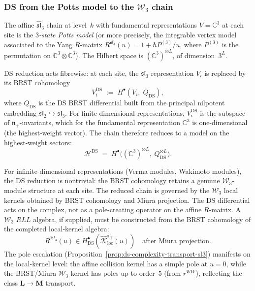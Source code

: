 \subsubsection{DS from the Potts model to the $\mathcal{W}_3$
chain}

\begin{construction}
\label{constr:ds-potts-to-w3}
%
%
The affine $\widehat{\mathfrak{sl}}_3$ chain at level~$k$
with fundamental representations $V = \mathbb{C}^3$ at each
site is the \emph{$3$-state Potts model} (or more precisely,
the integrable vertex model associated to the Yang $R$-matrix
$R^{\mathfrak{sl}_3}(u) = 1 + \hbar P^{(3)}/u$, where
$P^{(3)}$ is the permutation on $\mathbb{C}^3 \otimes
\mathbb{C}^3$). The Hilbert space is $(\mathbb{C}^3)^{\otimes
L}$, of dimension~$3^L$.

DS reduction acts fibrewise: at each site, the
$\mathfrak{sl}_3$ representation $V_i$ is replaced by its
BRST cohomology
\begin{equation}
\label{eq:ds-site-reduction}
V_i^{\mathrm{DS}}
\;:=\;
H^\bullet(V_i,\; Q_{\mathrm{DS}}),
\end{equation}
where $Q_{\mathrm{DS}}$ is the DS BRST differential built from
the principal nilpotent embedding
$\mathfrak{sl}_2 \hookrightarrow \mathfrak{sl}_3$. For
finite-dimensional representations, $V_i^{\mathrm{DS}}$ is
the subspace of $\mathfrak{n}_+$-invariants, which for the
fundamental representation $\mathbb{C}^3$ is one-dimensional
(the highest-weight vector). The chain therefore reduces to
a model on the highest-weight sectors:
\begin{equation}
\label{eq:ds-chain-reduction}
\mathcal{H}^{\mathrm{DS}}
\;=\;
H^\bullet\!\bigl((\mathbb{C}^3)^{\otimes L},\;
 Q_{\mathrm{DS}}^{\otimes L}\bigr).
\end{equation}

For infinite-dimensional representations (Verma modules,
Wakimoto modules), the DS reduction is nontrivial: the
BRST cohomology retains a genuine $\mathcal{W}_3$-module
structure at each site. The reduced chain is governed by the
$\mathcal{W}_3$ local kernels obtained by BRST cohomology and Miura
projection. The DS differential acts on the complex, not as a
pole-creating operator on the affine $R$-matrix. A $\mathcal W_3$
$RLL$ algebra, if supplied, must be constructed from the BRST
cohomology of the completed local-kernel algebra:
\begin{equation}
\label{eq:ds-r-matrix-transport}
R^{\mathcal{W}_3}(u)
\in
H^\bullet_{\mathrm{DS}}\!\left(
\widehat{\mathcal K}^{\mathfrak{sl}_3}_{\mathrm{loc}}(u)\right)
\quad\text{after Miura projection.}
\end{equation}
The pole escalation
(Proposition~\ref{prop:ds-complexity-transport-sl3}) manifests
on the local-kernel level: the affine collision kernel has a simple
pole at $u=0$, while the BRST/Miura $\mathcal{W}_3$ kernel has poles
up to order~$5$ (from $r^{WW}$), reflecting the class
$\mathbf{L}\to\mathbf{M}$ transport.
\end{construction}


